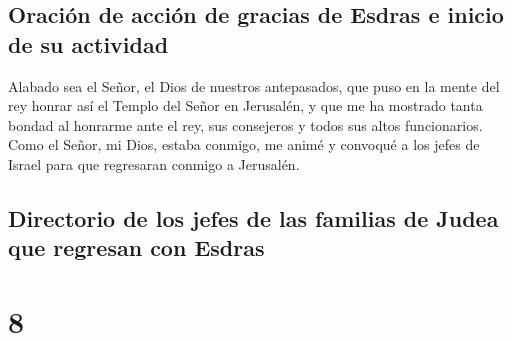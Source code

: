 \hypertarget{oraciuxf3n-de-acciuxf3n-de-gracias-de-esdras-e-inicio-de-su-actividad}{%
\subsection{Oración de acción de gracias de Esdras e inicio de su
actividad}\label{oraciuxf3n-de-acciuxf3n-de-gracias-de-esdras-e-inicio-de-su-actividad}}

 Alabado sea el Señor, el Dios de nuestros antepasados,
que puso en la mente del rey honrar así el Templo del Señor en
Jerusalén,  y que me ha mostrado tanta bondad al honrarme
ante el rey, sus consejeros y todos sus altos funcionarios. Como el
Señor, mi Dios, estaba conmigo, me animé y convoqué a los jefes de
Israel para que regresaran conmigo a Jerusalén.

\hypertarget{directorio-de-los-jefes-de-las-familias-de-judea-que-regresan-con-esdras}{%
\subsection{Directorio de los jefes de las familias de Judea que
regresan con
Esdras}\label{directorio-de-los-jefes-de-las-familias-de-judea-que-regresan-con-esdras}}

\hypertarget{section-7}{%
\section{8}\label{section-7}}

